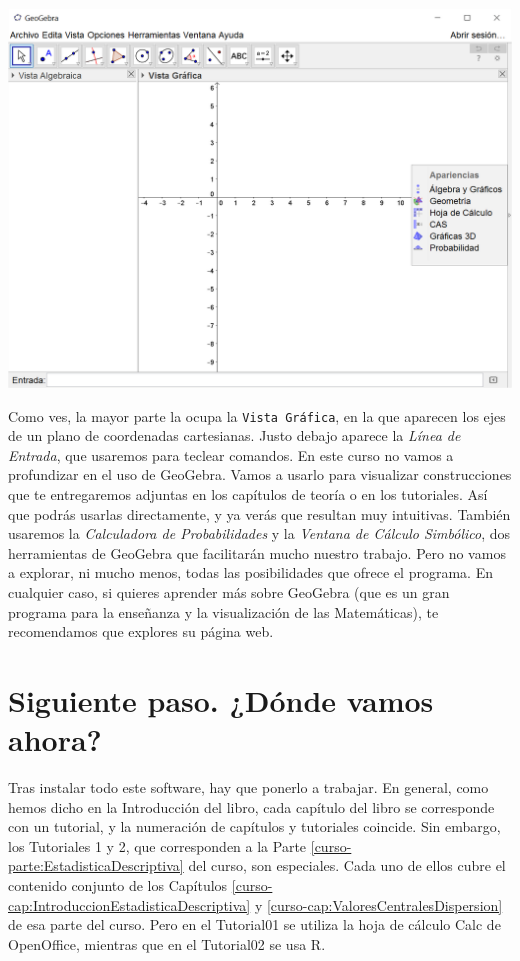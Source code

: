 \documentclass[10pt,a4paper]{article}\usepackage[]{graphicx}\usepackage[]{color}
\newcounter {cont01}
\begin{document}
    \begin{center}
    \includegraphics[width=15cm]{../fig/Tut00-GeoGebraSetup06-201605.png}
    \end{center}
Como ves, la mayor parte la ocupa la {\tt Vista Gráfica}, en la que aparecen los ejes de un plano
de coordenadas cartesianas.  Justo debajo aparece la {\em Línea de Entrada}, que usaremos para teclear comandos. En este curso no vamos a profundizar en el uso de GeoGebra. Vamos a usarlo para visualizar construcciones que te entregaremos adjuntas en los capítulos de
teoría o en los tutoriales. Así que podrás usarlas directamente, y ya verás que resultan muy
intuitivas. También usaremos la {\em Calculadora de Probabilidades} y la {\em Ventana de Cálculo Simbólico}, dos herramientas de GeoGebra que facilitarán mucho nuestro trabajo. Pero no vamos a explorar, ni mucho menos, todas las posibilidades que ofrece el programa. En cualquier caso, si quieres aprender más sobre GeoGebra (que es un gran programa para la enseñanza y la visualización de las Matemáticas), te recomendamos que explores su página web.
\section{Siguiente paso. ¿Dónde vamos ahora?}

Tras instalar todo este software, hay que ponerlo a trabajar. En general, como hemos dicho en la Introducción del libro, cada capítulo del libro se corresponde con un tutorial, y la numeración de capítulos y tutoriales coincide. Sin embargo, los Tutoriales 1 y 2, que corresponden a la Parte \ref{curso-parte:EstadisticaDescriptiva} del curso, son especiales. Cada uno de ellos cubre el contenido conjunto de los Capítulos \ref{curso-cap:IntroduccionEstadisticaDescriptiva} y \ref{curso-cap:ValoresCentralesDispersion} de esa parte del curso. Pero en el Tutorial01 se utiliza la hoja de cálculo Calc de OpenOffice, mientras que en el Tutorial02 se usa R.
\end{document}
